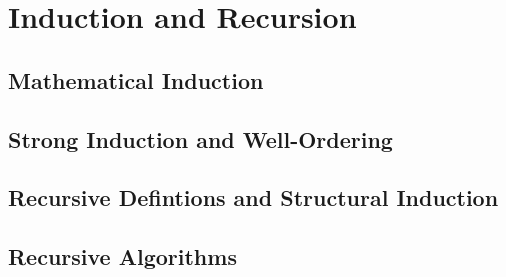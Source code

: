\documentclass[../discrete.tex]{subfiles}
\begin{document}
\chapter{Induction and Recursion}
\section{Mathematical Induction}
\section{Strong Induction and Well-Ordering}
\section{Recursive Defintions and Structural Induction}
\section{Recursive Algorithms}
\end{document}
